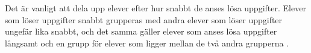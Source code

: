\textcolor{turkos} {Det är vanligt att dela upp elever efter hur snabbt de anses lösa uppgifter. Elever som löser uppgifter snabbt grupperas med andra elever som löser uppgifter ungefär lika snabbt, och det samma gäller elever som anses lösa uppgifter långsamt och en grupp för elever som ligger mellan de två andra grupperna \cite{Skolverket03}. }
